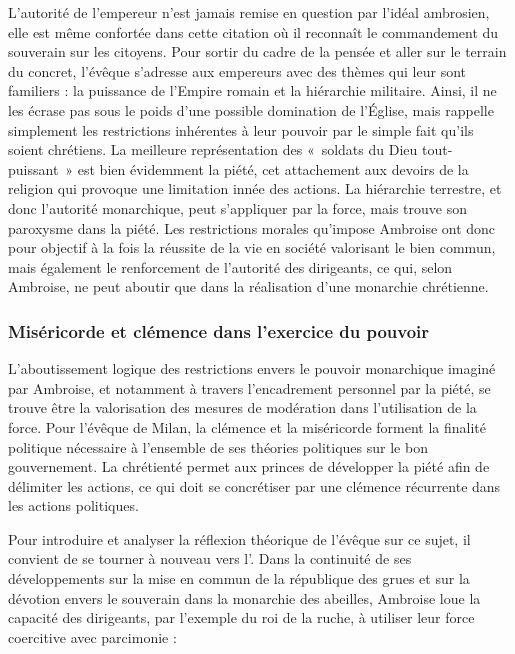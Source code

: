 L'autorité de l'empereur n'est jamais remise en question par l'idéal ambrosien, elle est même confortée dans cette citation où il reconnaît le commandement du souverain sur les citoyens. Pour sortir du cadre de la pensée et aller sur le terrain du concret, l'évêque s'adresse aux empereurs avec des thèmes qui leur sont familiers : la puissance de l'Empire romain et la hiérarchie militaire. Ainsi, il ne les écrase pas sous le poids d'une possible domination de l'Église, mais rappelle simplement les restrictions inhérentes à leur pouvoir par le simple fait qu'ils soient chrétiens. La meilleure représentation des «~soldats du Dieu tout-puissant~» est bien évidemment la piété, cet attachement aux devoirs de la religion qui provoque une limitation innée des actions. La hiérarchie terrestre, et donc l'autorité monarchique, peut s'appliquer par la force, mais trouve son paroxysme dans la piété. Les restrictions morales qu'impose Ambroise ont donc pour objectif à la fois la réussite de la vie en société valorisant le bien commun, mais également le renforcement de l'autorité des dirigeants, ce qui, selon Ambroise, ne peut aboutir que dans la réalisation d'une monarchie chrétienne.

\bigskip

\subsubsection{Miséricorde et clémence dans l'exercice du pouvoir}

L'aboutissement logique des restrictions envers le pouvoir monarchique imaginé par Ambroise, et notamment à travers l'encadrement personnel par la piété, se trouve être la valorisation des mesures de modération dans l'utilisation de la force. Pour l'évêque de Milan, la clémence et la miséricorde forment la finalité politique nécessaire à l'ensemble de ses théories politiques sur le bon gouvernement. La chrétienté permet aux princes de développer la piété afin de délimiter les actions, ce qui doit se concrétiser par une clémence récurrente dans les actions politiques.

\bigskip

Pour introduire et analyser la réflexion théorique de l’évêque sur ce sujet, il convient de se tourner à nouveau vers l’. Dans la continuité de ses développements sur la mise en commun de la république des grues et sur la dévotion envers le souverain dans la monarchie des abeilles, Ambroise loue la capacité des dirigeants, par l'exemple du roi de la ruche, à utiliser leur force coercitive avec parcimonie :

